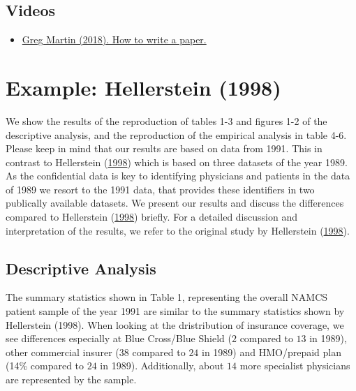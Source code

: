\documentclass[
]{book}
\providecommand{\tightlist}{%
  \setlength{\itemsep}{0pt}\setlength{\parskip}{0pt}}
\begin{document}
\hypertarget{videos}{%
\subsection{Videos}\label{videos}}

\begin{itemize}
\tightlist
\item
  \href{https://www.youtube.com/watch?v=Vky9PDKx5KU}{Greg Martin (2018).
  How to write a paper.}
\end{itemize}

\hypertarget{example-hellerstein-1998-4}{%
\section{Example: Hellerstein (1998)}\label{example-hellerstein-1998-4}}

We show the results of the reproduction of tables 1-3 and figures 1-2 of
the descriptive analysis, and the reproduction of the empirical analysis
in table 4-6. Please keep in mind that our results are based on data
from 1991. This in contrast to Hellerstein
(\protect\hyperlink{ref-hellerstein_importance_1998}{1998}) which is
based on three datasets of the year 1989. As the confidential data is
key to identifying physicians and patients in the data of 1989 we resort
to the 1991 data, that provides these identifiers in two publically
available datasets. We present our results and discuss the differences
compared to Hellerstein
(\protect\hyperlink{ref-hellerstein_importance_1998}{1998}) briefly. For
a detailed discussion and interpretation of the results, we refer to the
original study by Hellerstein
(\protect\hyperlink{ref-hellerstein_importance_1998}{1998}).

\hypertarget{descriptive-analysis}{%
\subsection{Descriptive Analysis}\label{descriptive-analysis}}

The summary statistics shown in Table 1, representing the overall NAMCS
patient sample of the year 1991 are similar to the summary statistics
shown by Hellerstein (1998). When looking at the dristribution of
insurance coverage, we see differences especially at Blue Cross/Blue
Shield (\(2%
\) compared to \(13%
\) in 1989), other commercial insurer (\(38%
\) compared to \(24%
\) in 1989) and HMO/prepaid plan (14\% compared to \(24%
\) in 1989). Additionally, about \(14%
\) more specialist physicians are represented by the sample.
\end{document}
